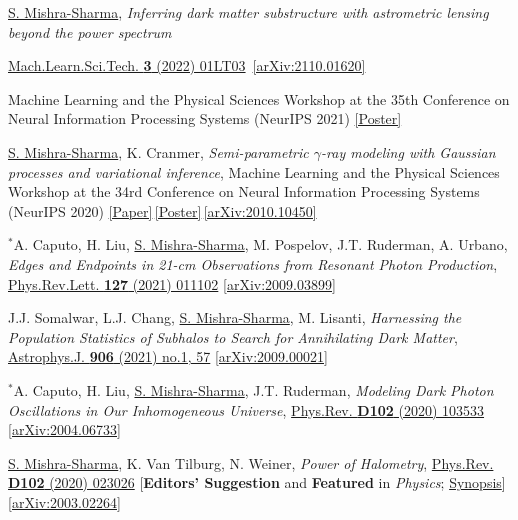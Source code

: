 \documentclass[letterpaper,11pt]{article}
\newenvironment{packed_itemize}{
\begin{itemize}[label=\raisebox{0.25ex}{\tiny$\bullet$}]
  \setlength{\itemsep}{4.0pt}
  \setlength{\parskip}{0pt}
  \setlength{\parsep}{0pt}}{\end{itemize}
}
\newenvironment{packed_enumerate}[1][]{
\begin{etaremune}[#1]
  \setlength{\itemsep}{4.0pt}
  \setlength{\parskip}{0pt}
  \setlength{\parsep}{0pt}}{\end{etaremune}
}
\begin{document}
\begin{packed_enumerate}[start=56]
  \item \underline{S. Mishra-Sharma}, \emph{Inferring dark matter substructure with astrometric lensing beyond the power spectrum}  
  \begin{packed_itemize}
    \item {\href{https://doi.org/10.1088/2632-2153/ac494a}{Mach.Learn.Sci.Tech. \textbf{3} (2022) 01LT03} \,\href{https://arxiv.org/abs/2110.01620}{[arXiv:2110.01620]}}
    \item {{Machine Learning and the Physical Sciences Workshop at the 35th Conference on Neural Information Processing Systems (NeurIPS 2021)} \href{https://ml4physicalsciences.github.io/2021/files/NeurIPS_ML4PS_2021_22_poster.png}{[Poster]}}
    \end{packed_itemize}
  \item\underline{S. Mishra-Sharma}, K. Cranmer, \emph{Semi-parametric $\gamma$-ray modeling with Gaussian processes and variational inference}, {Machine Learning and the Physical Sciences Workshop at the 34rd Conference on Neural Information Processing Systems (NeurIPS 2020)} \href{https://ml4physicalsciences.github.io/2020/files/NeurIPS_ML4PS_2020_20.pdf}{[Paper]}\,\href{https://ml4physicalsciences.github.io/2020/files/NeurIPS_ML4PS_2020_20_poster.pdf}{[Poster]}\,\href{https://arxiv.org/abs/2010.10450}{[arXiv:2010.10450]} 
  \item $^*$A. Caputo, H. Liu, \underline{S. Mishra-Sharma}, M. Pospelov, J.T. Ruderman, A. Urbano, \emph{Edges and Endpoints in 21-cm Observations from Resonant Photon Production},  \href{https://journals.aps.org/prl/abstract/10.1103/PhysRevLett.127.011102}{Phys.Rev.Lett. \textbf{127} (2021) 011102}   \href{https://arxiv.org/abs/2009.03899}{[arXiv:2009.03899]}
  \item J.J. Somalwar, L.J. Chang, \underline{S. Mishra-Sharma}, M. Lisanti, \emph{Harnessing the Population Statistics of Subhalos to Search for Annihilating Dark Matter}, \href{https://iopscience.iop.org/article/10.3847/1538-4357/abc87d}{Astrophys.J. \textbf{906} (2021) no.1, 57} \href{https://arxiv.org/abs/2009.00021}{[arXiv:2009.00021]}
  \item $^*$A. Caputo, H. Liu, \underline{S. Mishra-Sharma}, J.T. Ruderman, \emph{Modeling Dark Photon Oscillations in Our Inhomogeneous Universe}, \href{https://journals.aps.org/prd/abstract/10.1103/PhysRevD.102.103533}{Phys.Rev. \textbf{D102} (2020) 103533}   \href{https://arxiv.org/abs/2004.06733}{[arXiv:2004.06733]}
  \item \underline{S. Mishra-Sharma}, K. Van Tilburg, N. Weiner, \emph{Power of Halometry}, \href{https://journals.aps.org/prd/abstract/10.1103/PhysRevD.102.023026}{Phys.Rev. \textbf{D102} (2020) 023026} [\textbf{Editors' Suggestion} and \textbf{Featured} in \emph{Physics}; \href{https://physics.aps.org/articles/v13/s98}{Synopsis}]  \href{https://arxiv.org/abs/2003.02264}{[arXiv:2003.02264]}

\end{packed_enumerate}
\end{document}
